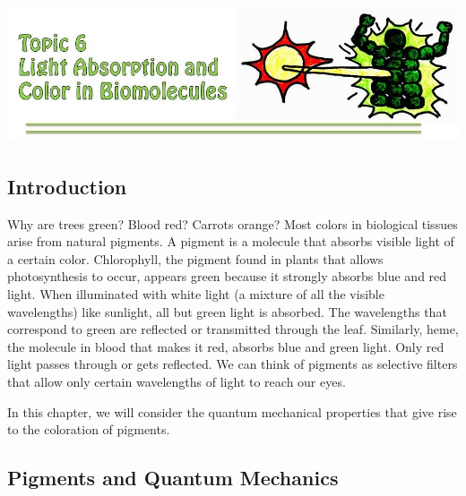 \setcounter{chapter}{6}
\setcounter{section}{0}
\setcounter{figure}{0}
\setcounter{equation}{0}
\setcounter{table}{0}
\chapter*{\includegraphics[width=\textwidth]{./figures/Topic6/Topic6.jpg}}

\section{Introduction}

Why are trees green?  Blood red?  Carrots orange?  Most colors in biological tissues arise from natural pigments.  A pigment is a molecule that absorbs visible light of a certain color.  Chlorophyll, the pigment found in plants that allows photosynthesis to occur, appears green because it strongly absorbs blue and red light.  When illuminated with white light (a mixture of all the visible wavelengths) like sunlight, all but green light is absorbed.  The wavelengths that correspond to green are reflected or transmitted through the leaf.  Similarly, heme, the molecule in blood that makes it red, absorbs blue and green light.  Only red light passes through or gets reflected.  We can think of pigments as selective filters that allow only certain wavelengths of light to reach our eyes.

In this chapter, we will consider the quantum mechanical properties that give rise to the coloration of pigments.  

\section{Pigments and Quantum Mechanics}

